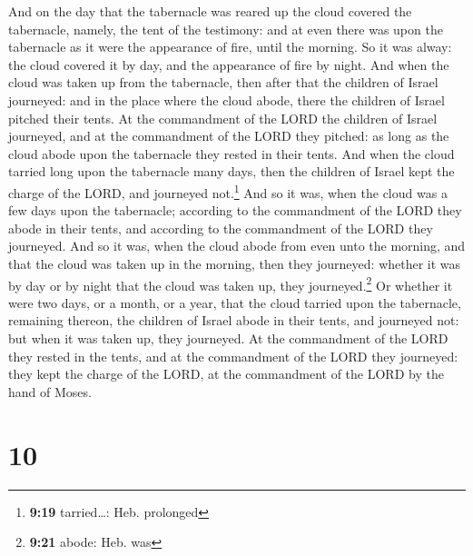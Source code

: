  And on the day that the tabernacle was reared up the
cloud covered the tabernacle, namely, the tent of the testimony: and at
even there was upon the tabernacle as it were the appearance of fire,
until the morning.  So it was alway: the cloud covered it
by day, and the appearance of fire by night.  And when
the cloud was taken up from the tabernacle, then after that the children
of Israel journeyed: and in the place where the cloud abode, there the
children of Israel pitched their tents.  At the
commandment of the LORD the children of Israel journeyed, and at the
commandment of the LORD they pitched: as long as the cloud abode upon
the tabernacle they rested in their tents.  And when the
cloud tarried long upon the tabernacle many days, then the children of
Israel kept the charge of the LORD, and journeyed not.\footnote{\textbf{9:19}
  tarried\ldots: Heb. prolonged}  And so it was, when the
cloud was a few days upon the tabernacle; according to the commandment
of the LORD they abode in their tents, and according to the commandment
of the LORD they journeyed.  And so it was, when the
cloud abode from even unto the morning, and that the cloud was taken up
in the morning, then they journeyed: whether it was by day or by night
that the cloud was taken up, they journeyed.\footnote{\textbf{9:21}
  abode: Heb. was}  Or whether it were two days, or a
month, or a year, that the cloud tarried upon the tabernacle, remaining
thereon, the children of Israel abode in their tents, and journeyed not:
but when it was taken up, they journeyed.  At the
commandment of the LORD they rested in the tents, and at the commandment
of the LORD they journeyed: they kept the charge of the LORD, at the
commandment of the LORD by the hand of Moses.

\hypertarget{section-9}{%
\section{10}\label{section-9}}

